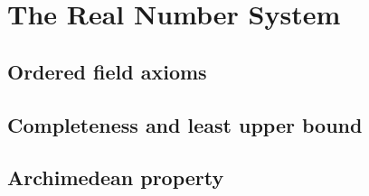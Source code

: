 
\section{The Real Number System}

\subsection{Ordered field axioms}


\subsection{Completeness and least upper bound}


\subsection{Archimedean property}

